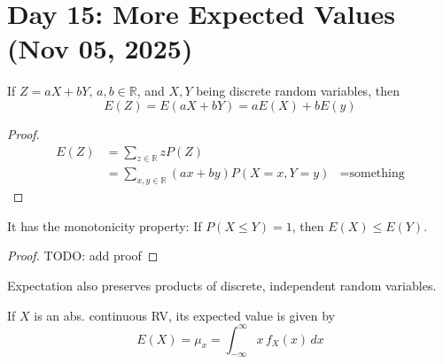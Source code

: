 \section{Day 15: More Expected Values (Nov 05, 2025)}

\begin{simplethm}
    If $Z = aX + bY$, $a, b \in \mathbb{R}$, and $X, Y$ being discrete random variables, then
    \[
    E(Z) = E(aX + bY) = aE(X) + bE(y)
    \]
\end{simplethm}

\begin{proof}
    \begin{align*}
        E(Z) &= \sum_{z \in \mathbb{R}} z P(Z) \\
        &= \sum_{x, y \in \mathbb{R}} (ax + by) P(X = x, Y = y)
        &= \text{something}
    \end{align*}
\end{proof}

\noindent It has the monotonicity property: If $P(X \leq Y) = 1$, then $E(X) \leq E(Y)$.

\begin{proof}
    TODO: add proof
\end{proof}

\noindent Expectation also preserves products of discrete, independent random variables.

\begin{definition}
If $X$ is an abs. continuous RV, its expected value is given by
\[
    E(X) = \mu_x = \int_{-\infty}^\infty x \, f_X(x) \, dx
\]
\end{definition}
